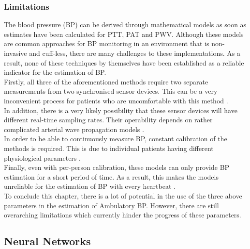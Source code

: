 \subsubsection{Limitations}
The blood pressure (BP) can be derived through mathematical models as 
soon as estimates have been calculated for PTT, PAT and PWV. Although 
these models are common approaches for BP monitoring in an environment 
that is non-invasive and cuff-less, there are many challenges to these 
implementations. As a result, none of these techniques by themselves 
have been established as a reliable indicator for the estimation 
of BP. \\ \newline \noindent Firstly, all three of the aforementioned 
methods require two separate measurements from two synchronised sensor 
devices. This can be a very inconvenient process for patients who are
uncomfortable with this method \cite{Jeong2021}. \\ \newline \noindent In 
addition, there is a very likely possibility that these sensor devices 
will have different real-time sampling rates. Their operability depends 
on rather complicated arterial wave propagation 
models \cite{ElHajj2020}. \\ \newline \noindent In order to be able to 
continuously measure BP, constant calibration of the methods is 
required. This is due to individual patients having different 
physiological parameters \cite{Jeong2021}. \\ \newline \noindent Finally, 
even with per-person calibration, these models can only provide BP 
estimation for a short period of time. As a result, this makes the 
models unreliable for the estimation of BP with every 
heartbeat \cite{ElHajj2020}. \\ \newline \noindent To conclude this 
chapter, there is a lot of potential in the use of the three above 
parameters in the estimation of Ambulatory BP. However, there are still 
overarching limitations which currently hinder the progress of these 
parameters. 




 \subsection{Neural Networks}

